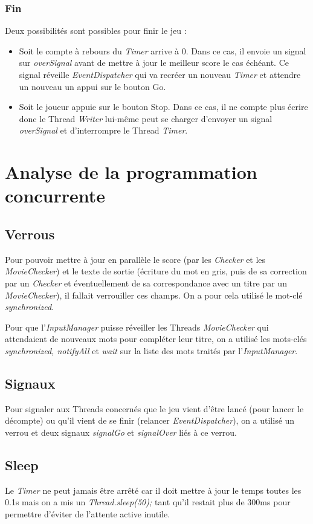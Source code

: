 \documentclass[a4paper,11pt]{article}
\begin{document}
\subsubsection{Fin}
Deux possibilités sont possibles pour finir le jeu :
\begin{itemize}
\item Soit le compte à rebours du \textit{Timer} arrive à 0. Dans ce cas, il envoie un signal sur \textit{overSignal} avant de mettre à jour le meilleur score le cas échéant. Ce signal réveille \textit{EventDispatcher} qui va recréer un nouveau \textit{Timer} et attendre un nouveau un appui sur le bouton Go.
\item Soit le joueur appuie sur le bouton Stop. Dans ce cas, il ne compte plus écrire donc le Thread \textit{Writer} lui-même peut se charger d'envoyer un signal \textit{overSignal} et d'interrompre le Thread \textit{Timer}.
\end{itemize}
\section{Analyse de la programmation concurrente}
\subsection{Verrous}
Pour pouvoir mettre à jour en parallèle le score (par les \textit{Checker} et les \textit{MovieChecker}) et le texte de sortie (écriture du mot en gris, puis de sa correction par un \textit{Checker} et éventuellement de sa correspondance avec un titre par un \textit{MovieChecker}), il fallait verrouiller ces champs. On a pour cela utilisé le mot-clé \textit{synchronized}.\par
Pour que l'\textit{InputManager} puisse réveiller les Threads \textit{MovieChecker} qui attendaient de nouveaux mots pour compléter leur titre, on a utilisé les mots-clés \textit{synchronized, notifyAll} et \textit{wait} sur la liste des mots traités par l'\textit{InputManager}.
\subsection{Signaux}
Pour signaler aux Threads concernés que le jeu vient d'être lancé (pour lancer le décompte) ou qu'il vient de se finir (relancer \textit{EventDispatcher}), on a utilisé un verrou et deux signaux \textit{signalGo} et \textit{signalOver} liés à ce verrou.
\subsection{Sleep}
Le \textit{Timer} ne peut jamais être arrêté car il doit mettre à jour le temps toutes les 0.1s mais on a mis un \textit{Thread.sleep(50);} tant qu'il restait plus de 300ms pour permettre d'éviter de l'attente active inutile.
\end{document}
